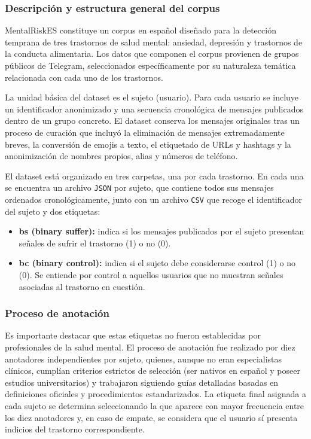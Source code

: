 \subsubsection{Descripción y estructura general del corpus}
MentalRiskES constituye un corpus en español diseñado para la detección temprana de tres trastornos de salud mental: ansiedad, depresión y trastornos de la conducta alimentaria. Los datos que componen el corpus provienen de grupos públicos de Telegram, seleccionados específicamente por su naturaleza temática relacionada con cada uno de los trastornos.

La unidad básica del dataset es el sujeto (usuario). Para cada usuario se incluye un identificador anonimizado y una secuencia cronológica de mensajes publicados dentro de un grupo concreto. El dataset conserva los mensajes originales tras un proceso de curación que incluyó la eliminación de mensajes extremadamente breves, la conversión de emojis a texto, el etiquetado de URLs y hashtags y la anonimización de nombres propios, alias y números de teléfono.

El dataset está organizado en tres carpetas, una por cada trastorno. En cada una se encuentra un archivo \texttt{JSON} por sujeto, que contiene todos sus mensajes ordenados cronológicamente, junto con un archivo \texttt{CSV} que recoge el identificador del sujeto y dos etiquetas:
\begin{itemize}
	\item \textbf{bs (binary suffer):} indica si los mensajes publicados por el sujeto presentan señales de sufrir el trastorno (1) o no (0).
	\item \textbf{bc (binary control):} indica si el sujeto debe considerarse control (1) o no (0). Se entiende por control a aquellos usuarios que no muestran señales asociadas al trastorno en cuestión.
\end{itemize}

\subsubsection{Proceso de anotación}
Es importante destacar que estas etiquetas no fueron establecidas por profesionales de la salud mental. El proceso de anotación fue realizado por diez anotadores independientes por sujeto, quienes, aunque no eran especialistas clínicos, cumplían criterios estrictos de selección (ser nativos en español y poseer estudios universitarios) y trabajaron siguiendo guías detalladas basadas en definiciones oficiales y procedimientos estandarizados. La etiqueta final asignada a cada sujeto se determina seleccionando la que aparece con mayor frecuencia entre los diez anotadores y, en caso de empate, se considera que el usuario sí presenta indicios del trastorno correspondiente.

